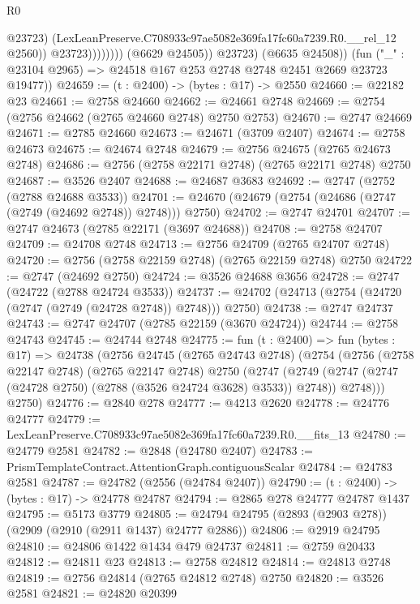 \begin{lexlean}{R0}
\begin{coremodule}
                                @23723)
                              (LexLeanPreserve.C708933c97ae5082e369fa17fc60a7239.R0.__rel_12 @2560))
                            @23723))))))))
            (@6629 @24505))
          @23723)
        (@6635 @24508))
      (fun ("_" : @23104 @2965) => @24518 @167 @253 @2748 @2748 @2451 @2669 @23723 @19477))
@24659 := (t : @2400) -> (bytes : @17) -> @2550
@24660 := @22182 @23
@24661 := @2758 @24660
@24662 := @24661 @2748
@24669 := @2754 (@2756 @24662 (@2765 @24660 @2748) @2750 @2753)
@24670 := @2747 @24669
@24671 := @2785 @24660
@24673 := @24671 (@3709 @2407)
@24674 := @2758 @24673
@24675 := @24674 @2748
@24679 := @2756 @24675 (@2765 @24673 @2748)
@24686 := @2756 (@2758 @22171 @2748) (@2765 @22171 @2748) @2750
@24687 := @3526 @2407
@24688 := @24687 @3683
@24692 := @2747 (@2752 (@2788 @24688 @3533))
@24701 := @24670 (@24679 (@2754 (@24686 (@2747 (@2749 (@24692 @2748)) @2748))) @2750)
@24702 := @2747 @24701
@24707 := @2747 @24673 (@2785 @22171 (@3697 @24688))
@24708 := @2758 @24707
@24709 := @24708 @2748
@24713 := @2756 @24709 (@2765 @24707 @2748)
@24720 := @2756 (@2758 @22159 @2748) (@2765 @22159 @2748) @2750
@24722 := @2747 (@24692 @2750)
@24724 := @3526 @24688 @3656
@24728 := @2747 (@24722 (@2788 @24724 @3533))
@24737 := @24702 (@24713 (@2754 (@24720 (@2747 (@2749 (@24728 @2748)) @2748))) @2750)
@24738 := @2747 @24737
@24743 := @2747 @24707 (@2785 @22159 (@3670 @24724))
@24744 := @2758 @24743
@24745 := @24744 @2748
@24775 := fun (t : @2400) =>
  fun (bytes : @17) =>
  @24738
    (@2756
      @24745
      (@2765 @24743 @2748)
      (@2754
        (@2756
          (@2758 @22147 @2748)
          (@2765 @22147 @2748)
          @2750
          (@2747
            (@2749 (@2747 (@2747 (@24728 @2750) (@2788 (@3526 @24724 @3628) @3533)) @2748))
            @2748)))
      @2750)
@24776 := @2840 @278
@24777 := @4213 @2620
@24778 := @24776 @24777
@24779 := LexLeanPreserve.C708933c97ae5082e369fa17fc60a7239.R0.__fits_13
@24780 := @24779 @2581
@24782 := @2848 (@24780 @2407)
@24783 := PrismTemplateContract.AttentionGraph.contiguousScalar
@24784 := @24783 @2581
@24787 := @24782 (@2556 (@24784 @2407))
@24790 := (t : @2400) -> (bytes : @17) -> @24778 @24787
@24794 := @2865 @278 @24777 @24787 @1437
@24795 := @5173 @3779
@24805 := @24794 @24795 (@2893 (@2903 @278)) (@2909 (@2910 (@2911 @1437) @24777 @2886))
@24806 := @2919 @24795
@24810 := @24806 @1422 @1434 @479 @24737
@24811 := @2759 @20433
@24812 := @24811 @23
@24813 := @2758 @24812
@24814 := @24813 @2748
@24819 := @2756 @24814 (@2765 @24812 @2748) @2750
@24820 := @3526 @2581
@24821 := @24820 @20399

\end{coremodule}
\end{lexlean}
